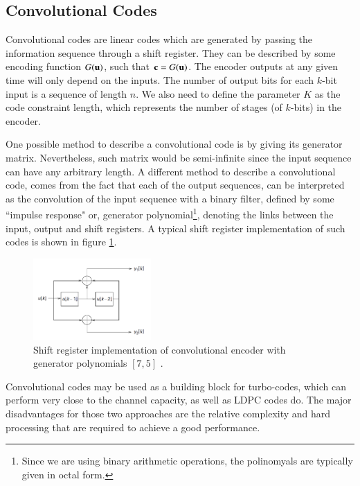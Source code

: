 \documentclass[12pt,a4paper,openright]{report}
\begin{document}
 \subsection{Convolutional Codes}
 Convolutional codes are linear codes which are generated by passing the information sequence through a shift register. They can be described by some encoding function $G({\bf{u}})$, such that ${\bf{c}}=G({\bf{u}})$. The encoder outputs at any given time will only depend on the inputs. The number of output bits for each $k$-bit input is a sequence of length $n$. We also need to define the parameter $K$ as the code constraint length, which represents the number of stages (of $k$-bits) in the encoder. 

One possible method to describe a convolutional code is by giving its generator matrix. Nevertheless, such matrix would be semi-infinite since the input sequence can have any arbitrary length\cite{Proakis}. A different method to describe a convolutional code, comes from the fact that each of the output sequences, can be interpreted as the convolution of the input sequence with a binary filter, defined by some ``impulse response" or, generator polynomial\footnote{Since we are using binary arithmetic operations, the polinomyals are typically given in octal form.}, denoting the links between the input, output and shift registers. A typical shift register implementation of such codes is shown in figure \ref{fig:convCodeImp}.
 
 
  \begin{figure}[H]
   \centering
     \includegraphics[width=0.4\textwidth]{convCode.PNG}
     \caption[Shift register implementation of convolutional encoder]{Shift register implementation of convolutional encoder with generator polynomials $[7,5]$ \cite{Madhow}.}
     \label{fig:convCodeImp}
 \end{figure}  
 
 Convolutional codes may be used as a building block for turbo-codes, which can perform very close to the channel capacity, as well as LDPC codes do. The major disadvantages for those two approaches are the relative complexity and hard processing that are required to achieve a good performance. 
\end{document}
